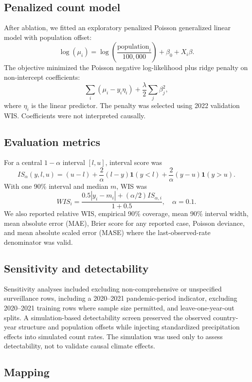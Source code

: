 \documentclass[11pt]{article}
\begin{document}
\subsection{Penalized count model}

After ablation, we fitted an exploratory penalized Poisson generalized linear model with population offset:
\[
\log(\mu_i)=\log\left(\frac{\mathrm{population}_i}{100{,}000}\right)+\beta_0+X_i\beta.
\]
The objective minimized the Poisson negative log-likelihood plus ridge penalty on non-intercept coefficients:
\[
\sum_i(\mu_i-y_i\eta_i)+\frac{\lambda}{2}\sum_j\beta_j^2,
\]
where \(\eta_i\) is the linear predictor. The penalty was selected using 2022 validation WIS. Coefficients were not interpreted causally.

\subsection{Evaluation metrics}

For a central \(1-\alpha\) interval \([l,u]\), interval score was
\[
IS_{\alpha}(y,l,u)=(u-l)+\frac{2}{\alpha}(l-y)\mathbf{1}(y<l)+\frac{2}{\alpha}(y-u)\mathbf{1}(y>u).
\]
With one 90\% interval and median \(m\), WIS was
\[
WIS_i=\frac{0.5|y_i-m_i|+(\alpha/2)IS_{\alpha,i}}{1+0.5}, \quad \alpha=0.1.
\]
We also reported relative WIS, empirical 90\% coverage, mean 90\% interval width, mean absolute error (MAE), Brier score for any reported case, Poisson deviance, and mean absolute scaled error (MASE) where the last-observed-rate denominator was valid.

\subsection{Sensitivity and detectability}

Sensitivity analyses included excluding non-comprehensive or unspecified surveillance rows, including a 2020--2021 pandemic-period indicator, excluding 2020--2021 training rows where sample size permitted, and leave-one-year-out splits. A simulation-based detectability screen preserved the observed country-year structure and population offsets while injecting standardized precipitation effects into simulated count rates. The simulation was used only to assess detectability, not to validate causal climate effects.

\subsection{Mapping}
\end{document}
